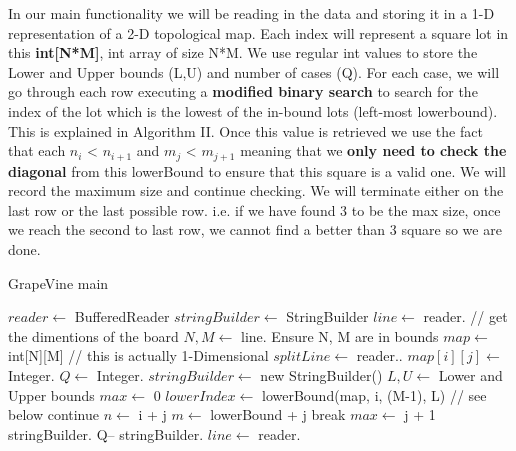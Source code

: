 \documentclass[12pt]{article}
\begin{document}
In our main functionality we will be reading in the data and storing it in a 1-D representation of a
2-D topological map. Each index will represent a square lot in this \textbf{int[N*M]}, int array of
size N*M. We use regular int values to store the Lower and Upper bounds (L,U) and number of cases (Q).
For each case, we will go through each row executing a \textbf{modified binary search} to search for
the index of the lot which is the lowest of the in-bound lots (left-most lowerbound). This is explained
in Algorithm II. Once this value is retrieved we use the fact that each $n_i$ < $n_{i+1}$ and $m_j$ < $m_{j+1}$
meaning that we \textbf{only need to check the diagonal} from this lowerBound to ensure that this square
is a valid one. We will record the maximum size and continue checking. We will terminate either on the
last row or the last possible row. i.e. if we have found 3 to be the max size, once we reach the second
to last row, we cannot find a better than 3 square so we are done.

\begin{algorithm}[H]
\caption{GrapeVine main}
\begin{algorithmic}
        \State $reader \gets$ BufferedReader
        \State $stringBuilder \gets$ StringBuilder
        \State $line \gets$ reader.
            // get the dimentions of the board
            \State $N, M \gets$  line.
            \State Ensure N, M are in bounds
            \State $map \gets$ int[N][M] // this is actually 1-Dimensional
                \State $splitLine \gets$ reader..
                    \State $map[i][j] \gets$ Integer.
                \EndFor
            \EndFor
            \State $Q \gets$ Integer.
            \State $stringBuilder \gets$ new StringBuilder()
                \State $L, U \gets$ Lower and Upper bounds
                \State $max \gets$ 0
                    \State $lowerIndex \gets$ lowerBound(map, i, (M-1), L) // see below
                        \State continue
                    \EndIf
                        \State $n \gets$ i + j
                        \State $m \gets$ lowerBound + j
                            \State break
                        \EndIf
                            \State $max \gets$ j + 1
                        \EndIf
                    \EndFor
                \EndFor
                \State stringBuilder.
                \State Q--
            \EndWhile
            \State stringBuilder.
            \State $line \gets$ reader.
        \EndWhile
    \EndProcedure
\end{algorithmic}
\end{algorithm}
\end{document}
